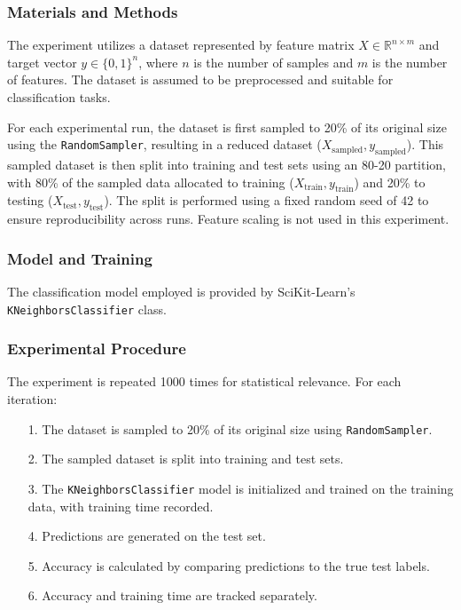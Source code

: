 \documentclass{article}
\theoremstyle{plain}
\theoremstyle{definition}
\theoremstyle{remark}
\begin{document}
\subsubsection{Materials and Methods}

The experiment utilizes a dataset represented by feature matrix $ X \in \mathbb{R}^{n \times m} $ and target vector $ y \in \{0, 1\}^n $, where $ n $ is the number of samples and $ m $ is the number of features. The dataset is assumed to be preprocessed and suitable for classification tasks.

For each experimental run, the dataset is first sampled to 20\% of its original size using the \texttt{RandomSampler}, resulting in a reduced dataset ($ X_{\text{sampled}}, y_{\text{sampled}} $). This sampled dataset is then split into training and test sets using an 80-20 partition, with 80\% of the sampled data allocated to training ($ X_{\text{train}}, y_{\text{train}} $) and 20\% to testing ($ X_{\text{test}}, y_{\text{test}} $). The split is performed using a fixed random seed of 42 to ensure reproducibility across runs. Feature scaling is not used in this experiment.

\subsubsection{Model and Training}

The classification model employed is provided by SciKit-Learn's \texttt{KNeighborsClassifier} class.

\subsubsection{Experimental Procedure}

The experiment is repeated 1000 times for statistical relevance. For each iteration:

\begin{itemize}
	\item [1.] The dataset is sampled to 20\% of its original size using \texttt{RandomSampler}.
	\item [2.] The sampled dataset is split into training and test sets.
	\item [3.] The \texttt{KNeighborsClassifier} model is initialized and trained on the training data, with training time recorded.
	\item [4.] Predictions are generated on the test set.
	\item [5.] Accuracy is calculated by comparing predictions to the true test labels.
	\item [6.] Accuracy and training time are tracked separately.
\end{itemize}
\end{document}
